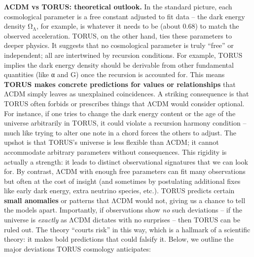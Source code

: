 \documentclass[]{article}
\newcommand{\subscript}[1]{\ensuremath{_{\mathrm{#1}}}}
\begin{document}
\textbf{ΛCDM vs TORUS: theoretical outlook.} In the standard picture,
each cosmological parameter is a free constant adjusted to fit data --
the dark energy density
Ω\subscript{Λ}, for
example, is whatever it needs to be (about 0.68) to match the observed
acceleration. TORUS, on the other hand, ties these parameters to deeper
physics. It suggests that no cosmological parameter is truly ``free'' or
independent; all are intertwined by recursion conditions. For example,
TORUS implies the dark energy density should be derivable from other
fundamental quantities (like α and G) once the recursion is accounted
for​. This means \textbf{TORUS makes concrete predictions for values or
relationships} that ΛCDM simply leaves as unexplained coincidences. A
striking consequence is that TORUS often forbids or prescribes things
that ΛCDM would consider optional. For instance, if one tries to change
the dark energy content or the age of the universe arbitrarily in TORUS,
it could violate a recursion harmony condition -- much like trying to
alter one note in a chord forces the others to adjust. The upshot is
that TORUS's universe is less flexible than ΛCDM; it cannot accommodate
arbitrary parameters without consequences. This rigidity is actually a
strength: it leads to distinct observational signatures that we can look
for. By contrast, ΛCDM with enough free parameters can fit many
observations but often at the cost of insight (and sometimes by
postulating additional fixes like early dark energy, extra neutrino
species, etc.). TORUS predicts certain \textbf{small anomalies} or
patterns that ΛCDM would not, giving us a chance to tell the models
apart. Importantly, if observations show \emph{no} such deviations -- if
the universe is \emph{exactly} as ΛCDM dictates with no surprises --
then TORUS can be ruled out. The theory ``courts risk'' in this way​,
which is a hallmark of a scientific theory: it makes bold predictions
that could falsify it. Below, we outline the major deviations TORUS
cosmology anticipates:
\end{document}

